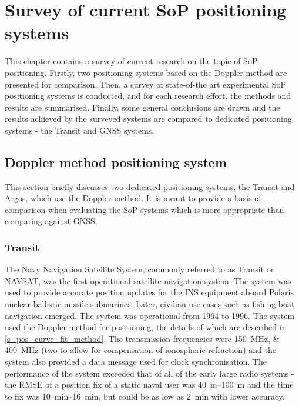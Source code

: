 \chapter{Survey of current SoP positioning systems}
\label{s_sop}
This chapter contains a survey of current research on the topic of SoP positioning. Firstly, two positioning systems based on the Doppler method are presented for comparison. Then, a survey of state-of-the art experimental SoP positioning systems is conducted, and for each research effort, the methods and results are summarised. Finally, some general conclusions are drawn and the results achieved by the surveyed systems are compared to dedicated positioning systems - the Transit and GNSS systems.



\section{Doppler method positioning system}
\label{s_sop_dopp_systems}
This section briefly discusses two dedicated positioning systems, the Transit and Argos, which use the Doppler method. It is meant to provide a basis of comparison when evaluating the SoP systems which is more appropriate than comparing against GNSS.


\subsection{Transit}
The Navy Navigation Satellite System, commonly referred to as Transit or NAVSAT, was the first operational satellite navigation system. The system was used to provide accurate position updates for the INS equipment aboard Polaris nuclear ballistic missile submarines. Later, civilian use cases such as fishing boat navigation emerged. The system was operational from 1964 to 1996. The system used the Doppler method for positioning, the details of which are described in \autoref{s_pos_curve_fit_method}. The transmission frequencies were \qtylist{150;400}{MHz} (two to allow for compensation of ionospheric refraction) and the system also provided a data message used for clock synchronisation. The performance of the system exceeded that of all of the early large radio systems - the RMSE of a position fix of a static naval user was \qtyrange{40}{100}{m} and the time to fix was \qtyrange{10}{16}{min}, but could be as low as \qty{2}{min} with lower accuracy\cite{sat16}.

